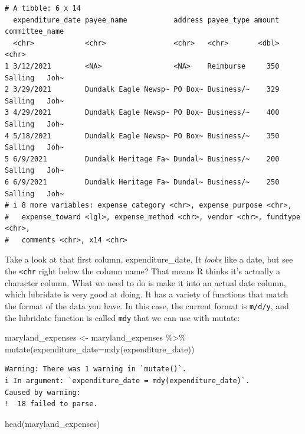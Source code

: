 \documentclass[
  letterpaper,
  DIV=11,
  numbers=noendperiod]{scrreprt}
\newenvironment{Shaded}{\begin{snugshade}}{\end{snugshade}}
\newcommand{\AttributeTok}[1]{\textcolor[rgb]{0.40,0.45,0.13}{#1}}
\newcommand{\FunctionTok}[1]{\textcolor[rgb]{0.28,0.35,0.67}{#1}}
\newcommand{\NormalTok}[1]{\textcolor[rgb]{0.00,0.23,0.31}{#1}}
\newcommand{\OtherTok}[1]{\textcolor[rgb]{0.00,0.23,0.31}{#1}}
\newcommand{\SpecialCharTok}[1]{\textcolor[rgb]{0.37,0.37,0.37}{#1}}
\begin{document}
\begin{verbatim}
# A tibble: 6 x 14
  expenditure_date payee_name           address payee_type amount committee_name
  <chr>            <chr>                <chr>   <chr>       <dbl> <chr>         
1 3/12/2021        <NA>                 <NA>    Reimburse     350 Salling   Joh~
2 3/29/2021        Dundalk Eagle Newsp~ PO Box~ Business/~    329 Salling   Joh~
3 4/29/2021        Dundalk Eagle Newsp~ PO Box~ Business/~    400 Salling   Joh~
4 5/18/2021        Dundalk Eagle Newsp~ PO Box~ Business/~    350 Salling   Joh~
5 6/9/2021         Dundalk Heritage Fa~ Dundal~ Business/~    200 Salling   Joh~
6 6/9/2021         Dundalk Heritage Fa~ Dundal~ Business/~    250 Salling   Joh~
# i 8 more variables: expense_category <chr>, expense_purpose <chr>,
#   expense_toward <lgl>, expense_method <chr>, vendor <chr>, fundtype <chr>,
#   comments <chr>, x14 <chr>
\end{verbatim}

Take a look at that first column, expenditure\_date. It \emph{looks}
like a date, but see the \texttt{\textless{}chr} right below the column
name? That means R thinks it's actually a character column. What we need
to do is make it into an actual date column, which lubridate is very
good at doing. It has a variety of functions that match the format of
the data you have. In this case, the current format is \texttt{m/d/y},
and the lubridate function is called \texttt{mdy} that we can use with
mutate:

\begin{Shaded}
\begin{Highlighting}[]
\NormalTok{maryland\_expenses }\OtherTok{\textless{}{-}}\NormalTok{ maryland\_expenses }\SpecialCharTok{\%\textgreater{}\%} \FunctionTok{mutate}\NormalTok{(}\AttributeTok{expenditure\_date=}\FunctionTok{mdy}\NormalTok{(expenditure\_date))}
\end{Highlighting}
\end{Shaded}

\begin{verbatim}
Warning: There was 1 warning in `mutate()`.
i In argument: `expenditure_date = mdy(expenditure_date)`.
Caused by warning:
!  18 failed to parse.
\end{verbatim}

\begin{Shaded}
\begin{Highlighting}[]
\FunctionTok{head}\NormalTok{(maryland\_expenses)}
\end{Highlighting}
\end{Shaded}
\end{document}

